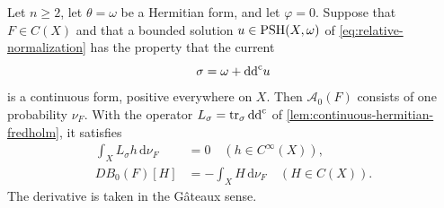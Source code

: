 \begin{theorem}\label{thm:continuous-hessian-adjoint-uniqueness}
Let $n\geq2$, let $\theta=\omega$ be a Hermitian form, and let $\varphi=0$.
Suppose that $F\in C(X)$ and that a bounded solution $u\in\mathrm{PSH}(X,\omega)$
of \eqref{eq:relative-normalization} has the property that the current
\[
 \sigma=\omega+\mathrm{dd}^{\mathrm{c}} u
\]
is a continuous form, positive everywhere on $X$. Then $\mathcal A_0(F)$
consists of one probability $\nu_F$. With the operator
$L_\sigma=\operatorname{tr}_\sigma\mathrm{dd}^{\mathrm{c}}$ of
\cref{lem:continuous-hermitian-fredholm}, it satisfies
\begin{align*}
 \int_X L_\sigma h\,\mathrm d\nu_F&=0\quad(h\in C^\infty(X)),\\
 DB_0(F)[H]&=-\int_XH\,\mathrm d\nu_F\quad(H\in C(X)).
\end{align*}
The derivative is taken in the G\^ateaux sense.
\end{theorem}
